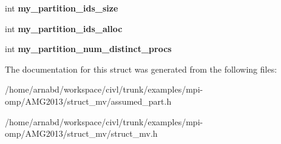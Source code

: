 \begin{DoxyCompactItemize}
\item 
\hypertarget{structhypre__StructAssumedPart_a1d53cbd10ff46d0509b70090cb485f01}{}int {\bfseries my\+\_\+partition\+\_\+ids\+\_\+size}\label{structhypre__StructAssumedPart_a1d53cbd10ff46d0509b70090cb485f01}

\item 
\hypertarget{structhypre__StructAssumedPart_a4ce606df4b04a235640a099f32969adc}{}int {\bfseries my\+\_\+partition\+\_\+ids\+\_\+alloc}\label{structhypre__StructAssumedPart_a4ce606df4b04a235640a099f32969adc}

\item 
\hypertarget{structhypre__StructAssumedPart_af0cdde3ad8e6bdc9f809e63b8e6bbb1f}{}int {\bfseries my\+\_\+partition\+\_\+num\+\_\+distinct\+\_\+procs}\label{structhypre__StructAssumedPart_af0cdde3ad8e6bdc9f809e63b8e6bbb1f}

\end{DoxyCompactItemize}


The documentation for this struct was generated from the following files\+:\begin{DoxyCompactItemize}
\item 
/home/arnabd/workspace/civl/trunk/examples/mpi-\/omp/\+A\+M\+G2013/struct\+\_\+mv/assumed\+\_\+part.\+h\item 
/home/arnabd/workspace/civl/trunk/examples/mpi-\/omp/\+A\+M\+G2013/struct\+\_\+mv/struct\+\_\+mv.\+h\end{DoxyCompactItemize}
